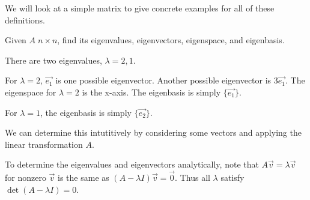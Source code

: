 \documentclass[../main.tex]{subfiles}
\begin{document}
We will look at a simple matrix to give concrete examples for all of these definitions.

\begin{example}[]
    Given \( A \; n \times n \), find its eigenvalues, eigenvectors, eigenspace, and eigenbasis.

    There are two eigenvalues, \( \lambda = 2, 1 \).

    For \( \lambda =2 \), \( \vec{e_1} \) is one possible eigenvector. Another possible eigenvector
    is \( 3\vec{e_1} \). The eigenspace for \( \lambda=2 \) is the x-axis. The eigenbasis is simply
    \( \{\vec{e_1}\} \).

    For \( \lambda=1 \), the eigenbasis is simply \( \{\vec{e_2}\} \).

    We can determine this intutitively by considering some vectors and applying the linear transformation \( A \).


\end{example}

To determine the eigenvalues and eigenvectors analytically, note that \( A\vec{v}=\lambda\vec{v} \) for nonzero \( \vec{v} \)
is the same as \( (A-\lambda I)\vec{v}=\vec{0} \). Thus all \( \lambda \) satisfy \( \det(A-\lambda I) =0 \).
\end{document}
